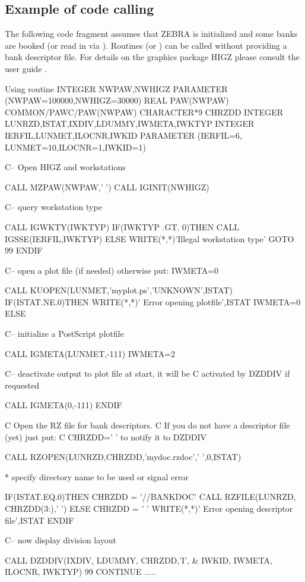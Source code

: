 \subsection[Example of code calling {\tt DZDDIV}]{Example of code calling }
 
The following code fragment assumes that  ZEBRA is initialized and
some banks are booked (or read in via ). 
Routines  (or ) can be called without providing 
a bank descriptor file. 
For details on the graphics package HIGZ please consult the user guide \cite{bib-HIGZ}.
 
\begin{XMPt}{Using routine }
      INTEGER NWPAW,NWHIGZ
      PARAMETER (NWPAW=100000,NWHIGZ=30000)
      REAL PAW(NWPAW)
      COMMON/PAWC/PAW(NWPAW)
      CHARACTER*9 CHRZDD
      INTEGER LUNRZD,ISTAT,IXDIV,LDUMMY,IWMETA,IWKTYP
      INTEGER IERFIL,LUNMET,ILOCNR,IWKID
      PARAMETER (IERFIL=6, LUNMET=10,ILOCNR=1,IWKID=1)
 
C--   Open HIGZ and workstations
 
      CALL MZPAW(NWPAW,' ')
      CALL IGINIT(NWHIGZ)
 
C--   query workstation type
 
      CALL IGWKTY(IWKTYP)
      IF(IWKTYP .GT. 0)THEN
          CALL IGSSE(IERFIL,IWKTYP)
      ELSE
          WRITE(*,*)'Illegal workstation type'
          GOTO 99
      ENDIF
 
C--   open a plot file (if needed) otherwise put: IWMETA=0
 
      CALL KUOPEN(LUNMET,'myplot.ps','UNKNOWN',ISTAT)
      IF(ISTAT.NE.0)THEN
         WRITE(*,*)' Error opening plotfile',ISTAT
         IWMETA=0
      ELSE
 
C--      initialize a PostScript plotfile
 
         CALL IGMETA(LUNMET,-111)
         IWMETA=2
 
C--      deactivate output to plot file at start, it will be
C        activated by DZDDIV if requested
 
         CALL IGMETA(0,-111)
      ENDIF
 
C     Open the RZ file for bank descriptors.
C     If you do not have a descriptor file (yet) just put:
C     CHRZDD=' ' to notify it to DZDDIV
 
      CALL RZOPEN(LUNRZD,CHRZDD,'mydoc.rzdoc',' ',0,ISTAT)
 
*     specify directory name to be used or signal error
 
      IF(ISTAT.EQ.0)THEN
         CHRZDD = '//BANKDOC'
         CALL RZFILE(LUNRZD, CHRZDD(3:),' ')
      ELSE
         CHRZDD = ' '
         WRITE(*,*)' Error opening descriptor file',ISTAT
      ENDIF
 
C--   now display division layout
 
      CALL DZDDIV(IXDIV, LDUMMY, CHRZDD,'I',
     &            IWKID, IWMETA, ILOCNR, IWKTYP)
99    CONTINUE
      .....
\end{XMPt}
 
